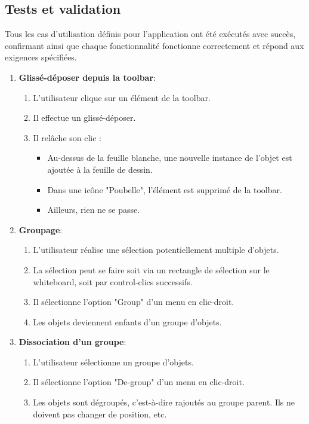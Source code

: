 \documentclass[a4paper,11pt]{article}
\begin{document}
\subsection{Tests et validation}
Tous les cas d'utilisation définis pour l'application ont été exécutés avec succès, confirmant ainsi que chaque fonctionnalité fonctionne correctement et répond aux exigences spécifiées.
\begin{enumerate}
    \item \textbf{Glissé-déposer depuis la toolbar}:
    \begin{enumerate}
        \item L'utilisateur clique sur un élément de la toolbar.
        \item Il effectue un glissé-déposer.
        \item Il relâche son clic :
        \begin{itemize}
            \item Au-dessus de la feuille blanche, une nouvelle instance de l'objet est ajoutée à la feuille de dessin.
            \item Dans une icône "Poubelle", l'élément est supprimé de la toolbar.
            \item Ailleurs, rien ne se passe.
        \end{itemize}
    \end{enumerate}
    \item \textbf{Groupage}:
    \begin{enumerate}
        \item L'utilisateur réalise une sélection potentiellement multiple d'objets.
        \item La sélection peut se faire soit via un rectangle de sélection sur le whiteboard, soit par control-clics successifs.
        \item Il sélectionne l'option "Group" d'un menu en clic-droit.
        \item Les objets deviennent enfants d'un groupe d'objets.
    \end{enumerate}
    \item \textbf{Dissociation d'un groupe}:
    \begin{enumerate}
        \item L'utilisateur sélectionne un groupe d'objets.
        \item Il sélectionne l'option "De-group" d'un menu en clic-droit.
        \item Les objets sont dégroupés, c'est-à-dire rajoutés au groupe parent. Ils ne doivent pas changer de position, etc.

\end{enumerate}
\end{enumerate}
\end{document}
